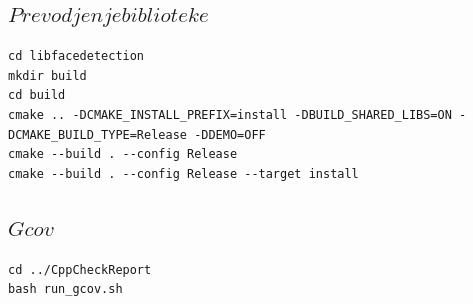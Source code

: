 \documentclass{article}
\begin{document}
\subsection*{$Prevodjenje biblioteke$}

\begin{verbatim}
cd libfacedetection
mkdir build
cd build
cmake .. -DCMAKE_INSTALL_PREFIX=install -DBUILD_SHARED_LIBS=ON -DCMAKE_BUILD_TYPE=Release -DDEMO=OFF
cmake --build . --config Release
cmake --build . --config Release --target install
\end{verbatim}

\subsection*{$Gcov$}
\begin{verbatim}
cd ../CppCheckReport
bash run_gcov.sh
\end{verbatim}

\selectfont


\selectfont

\end{document}
